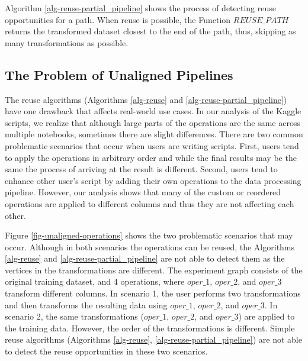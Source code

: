 Algorithm \ref{alg-reuse-partial_pipeline} shows the process of detecting reuse opportunities for a path.
When reuse is possible, the Function $REUSE\_PATH$ returns the transformed dataset closest to the end of the path, thus, skipping as many transformations as possible.

\subsection{The Problem of Unaligned Pipelines}
The reuse algorithms (Algorithms \ref{alg-reuse} and \ref{alg-reuse-partial_pipeline}) have one drawback that affects real-world use cases.
In our analysis of the Kaggle scripts, we realize that although large parts of the operations are the same across multiple notebooks, sometimes there are slight differences.
There are two common problematic scenarios that occur when users are writing scripts.
First, users tend to apply the operations in arbitrary order and while the final results may be the same the process of arriving at the result is different.
Second, users tend to enhance other user's script by adding their own operations to the data processing pipeline.
However, our analysis shows that many of the custom or reordered operations are applied to different columns and thus they are not affecting each other.

Figure \ref{fig-unaligned-operations} shows the two problematic scenarios that may occur.
Although in both scenarios the operations can be reused, the Algorithms \ref{alg-reuse} and \ref{alg-reuse-partial_pipeline} are not able to detect them as the vertices in the transformations are different. 
The experiment graph consists of the original training dataset, and 4 operations, where $oper\_1$, $oper\_2$, and $oper\_3$ transform different columns.
In scenario 1, the user performs two transformations and then transforms the resulting data using $oper\_1$, $oper\_2$, and $oper\_3$.
In scenario 2, the same transformations ($oper\_1$, $oper\_2$, and $oper\_3$) are applied to the training data.
However, the order of the transformations is different.
Simple reuse algorithms (Algorithms \ref{alg-reuse}, \ref{alg-reuse-partial_pipeline}) are not able to detect the reuse opportunities in these two scenarios.


